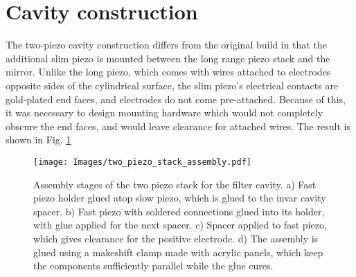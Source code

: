 \section{Cavity construction}

The two-piezo cavity construction differs from the original build in that the additional slim piezo is mounted between the long range piezo stack and the mirror. Unlike the long piezo, which comes with wires attached to electrodes opposite sides of the cylindrical surface, the slim piezo's electrical contacts are gold-plated end faces, and electrodes do not come pre-attached. Because of this, it was necessary to design mounting hardware which would not completely obscure the end faces, and would leave clearance for attached wires. The result is shown in Fig. \ref{fig:cavity_fig1}

\begin{figure}[!ht]
    \centering
    \texttt{[image: Images/two\_piezo\_stack\_assembly.pdf]}
    \caption{Assembly stages of the two piezo stack for the filter cavity. a) Fast piezo holder glued atop slow piezo, which is glued to the invar cavity spacer. b) Fast piezo with soldered connections glued into its holder, with glue applied for the next spacer. c) Spacer applied to fast piezo, which gives clearance for the positive electrode. d) The assembly is glued using a makeshift clamp made with acrylic panels, which keep the components sufficiently parallel while the glue cures.}
    \label{fig:cavity_fig1}
\end{figure}